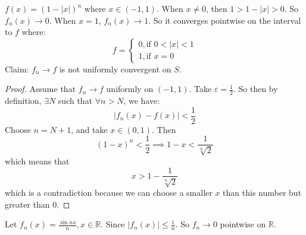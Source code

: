 \documentclass{report}
\begin{document}
\begin{examples}
    \begin{example}
        $f(x) = (1 - \lvert x \rvert)^{n}$ where $x \in(-1, 1)$. When $x \neq 0$, then $1 >1 - \lvert x \rvert >0$. So $f_{n}(x) \rightarrow0$. When $x = 1$, $f_{n}(x) \rightarrow1$. So it converges pointwise on the interval to $f$ where:
            \begin{equation*}
                f = \begin{cases}
                    0, \text{if $0 < \lvert x \rvert <1$} \\
                    1, \text{if $x = 0$}
                \end{cases}
            \end{equation*}
        Claim: $f_{n} \rightarrow f$ is not uniformly convergent on $S$. 
            \begin{proof}
                Assume that $f_{n} \rightarrow f$ uniformly on $(-1, 1)$. Take $\varepsilon = \frac{1}{2}$. So then by definition, $ \exists  N$ such that $\forall  n > N$, we have:
                    \begin{equation*}
                        \lvert f_{n}(x) - f(x) \rvert < \dfrac{1}{2}
                    \end{equation*}
                Choose $n = N + 1$, and take $x \in(0, 1)$. Then 
                    \begin{equation*}
                        (1 - x)^{n} <\dfrac{1}{2} \implies 1 - x < \dfrac{1}{\sqrt[n]{2}}
                    \end{equation*}
                which means that
                    \begin{equation*}
                        x >1 - \dfrac{1}{\sqrt[n]{2}}
                    \end{equation*}
                which is a contradiction because we can choose a smaller $x$ than this number but greater than $0$.
            \end{proof}
    \end{example}
    \begin{example}
        Let $f_{n}(x) = \frac{\sin{nx}}{n}, x \in \mathbb{R}$. Since $\lvert f_{n}(x) \rvert \leq\frac{1}{n}$. So $f_{n} \rightarrow0$ pointwise on $\mathbb{R}$. 


\end{example}
\end{examples}
\end{document}
